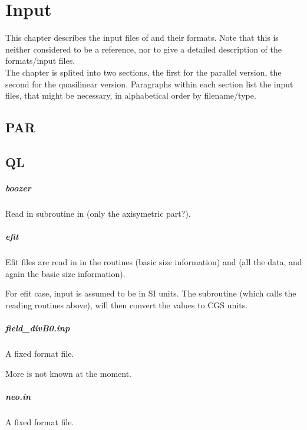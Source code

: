 \chapter{Input\label{ch:input}}
This chapter describes the input files of \neotwo and their formats.
Note that this is neither considered to be a reference, nor to give a
detailed description of the formats/input files.\\
The chapter is splited into two sections, the first for the parallel
version, the second for the quasilinear version. Paragraphs within each
section list the input files, that might be necessary, in alphabetical
order by filename/type.

\section{PAR}


\section{QL}


\paragraph{boozer}
Read in subroutine  in  (only
the axisymetric part?).

\paragraph{efit}
Efit files are read in  in the routines
 (basic size information) and
 (all the data, and again the basic size
information).

For efit case, input is assumed to be in SI units. The subroutine
 (which calls the reading routines above), will
then convert the values to CGS units.

\paragraph{field\_divB0.inp}
A fixed format file.

More is not known at the moment.

\paragraph{neo.in}
A fixed format file.

